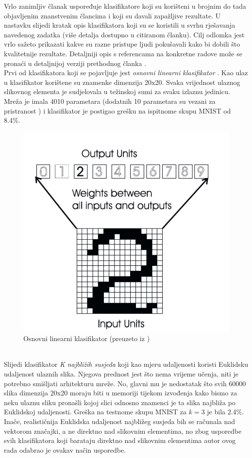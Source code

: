 \documentclass[times, utf8, diplomski]{fer}
\theoremstyle{definition}
\begin{document}
Vrlo zanimljiv članak \cite{LeCun95comparisonof} uspoređuje klasifikatore koji su korišteni u brojnim do tada objavljenim znanstvenim člancima i koji su davali zapažljive rezultate. U nastavku slijedi kratak opis klasifikatora koji su se koristili u svrhu rješavanja navedenog zadatka (više detalja dostupno u citiranom članku). Cilj odlomka jest vrlo sažeto prikazati kakve su razne pristupe ljudi pokušavali kako bi dobili što kvalitetnije rezultate. Detaljniji opis s referencama na konkretne radove može se pronaći u detaljnijoj verziji prethodnog članka \cite{Lecun95learningalgorithms}.
\\
Prvi od klasifikatora koji se pojavljuje jest \textit{osnovni linearni klasifikator} . Kao ulaz u klasifikator korištene su znamenke dimenzija 20x20. Svaka vrijednost ulaznog slikovnog elementa  je sudjelovala u težinskoj sumi za svaku izlaznu jedinicu. Mreža je imala 4010 parametara (dodatnih 10 parametara su vezani za pristranost ) i klasifikator je postigao grešku na ispitnome skupu MNIST od 8.4\%.
\begin{figure}[h]
\centering
\includegraphics[scale=0.7]{linear_classifier.png}
\caption{Osnovni linearni klasifikator (preuzeto iz \cite{Lecun95learningalgorithms})}
\end{figure}
\\
Slijedi klasifikator \textit{K najbližih susjeda}  koji kao mjeru udaljenosti koristi Euklidsku udaljenost ulaznih slika. Njegova prednost jest što nema vrijeme učenja, niti je potrebno smišljati arhitekturu mreže. No, glavni mu je nedostatak što svih 60000 slika dimenzija 20x20 moraju biti u memoriji tijekom izvođenja kako bismo za neku ulaznu sliku pronašli kojoj slici odnosno znamenci je ta slika najbliža po Euklidskoj udaljenosti. Greška na testnome skupu MNIST za $k=3$ je bila 2.4\%. Inače, realističnija Euklidska udaljenost najbližeg susjeda bih se računala nad vektorom značajki, a ne direktno nad slikovnim elementima, no zbog usporedbe svih klasifikatora koji barataju direktno nad slikovnim elementima autor ovog rada odabrao je ovakav način usporedbe.
\end{document}
